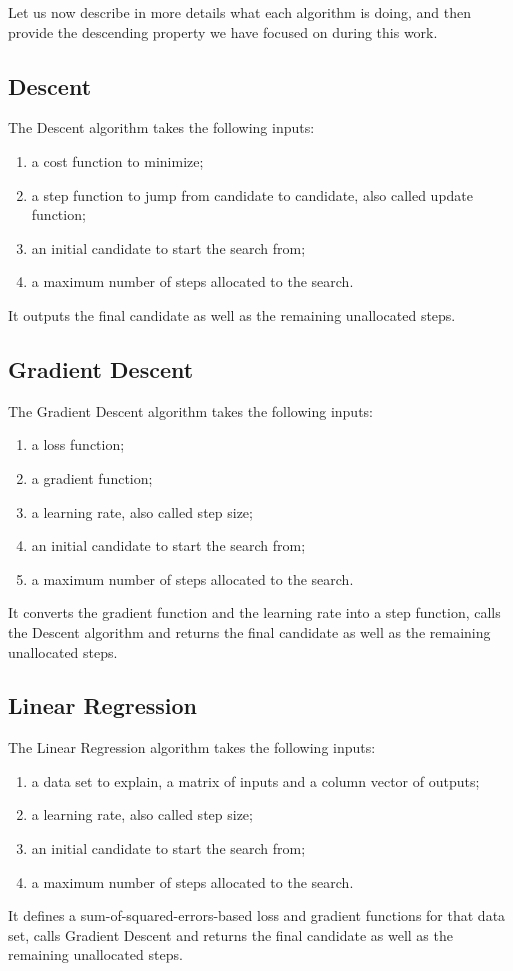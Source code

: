 \documentclass[]{report}
\begin{document}
Let us now describe in more details what each algorithm is doing, and
then provide the descending property we have focused on during this
work.

\subsection{Descent}
The Descent algorithm takes the following inputs:
\begin{enumerate}
\item a cost function to minimize;
\item a step function to jump from candidate to candidate, also called
  update function;
\item an initial candidate to start the search from;
\item a maximum number of steps allocated to the search.
\end{enumerate}
It outputs the final candidate as well as the remaining unallocated
steps.

\subsection{Gradient Descent}
The Gradient Descent algorithm takes the following inputs:
\begin{enumerate}
\item a loss function;
\item a gradient function;
\item a learning rate, also called step size;
\item an initial candidate to start the search from;
\item a maximum number of steps allocated to the search.
\end{enumerate}
It converts the gradient function and the learning rate into a step
function, calls the Descent algorithm and returns the final candidate
as well as the remaining unallocated steps.

\subsection{Linear Regression}
The Linear Regression algorithm takes the following inputs:
\begin{enumerate}
\item a data set to explain, a matrix of inputs and a column vector
  of outputs;
\item a learning rate, also called step size;
\item an initial candidate to start the search from;
\item a maximum number of steps allocated to the search.
\end{enumerate}
It defines a sum-of-squared-errors-based loss and gradient functions
for that data set, calls Gradient Descent and returns the final
candidate as well as the remaining unallocated steps.
\end{document}
